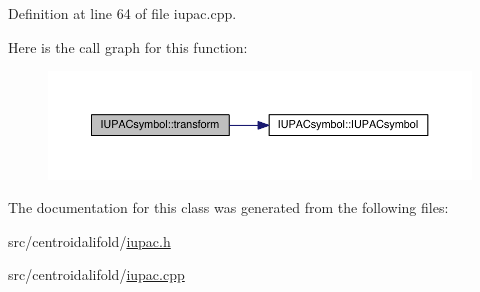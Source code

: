 Definition at line 64 of file iupac.\+cpp.



Here is the call graph for this function\+:
\nopagebreak
\begin{figure}[H]
\begin{center}
\leavevmode
\includegraphics[width=350pt]{class_i_u_p_a_csymbol_a51951cb7bac3f7ca28171bd4ac76a5b9_cgraph}
\end{center}
\end{figure}




The documentation for this class was generated from the following files\+:\begin{DoxyCompactItemize}
\item 
src/centroidalifold/\hyperlink{iupac_8h}{iupac.\+h}\item 
src/centroidalifold/\hyperlink{iupac_8cpp}{iupac.\+cpp}\end{DoxyCompactItemize}
